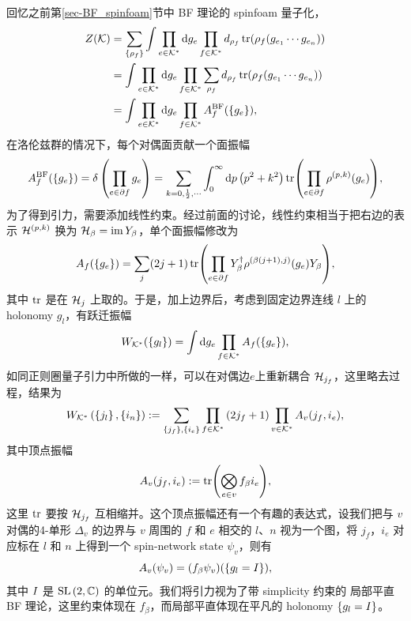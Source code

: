			回忆之前第\ref{sec-BF_spinfoam}节中 BF 理论的 spinfoam 量子化，
			\begin{equation}
				\begin{split}
					Z(\mathcal{K}) &= \sum_{\left\{ \rho_f \right\}} \int \prod_{e\in \mathcal{K}^*} \dd{g_e} \prod_{f\in \mathcal{K}^*} d_{\rho_f} \tr(\rho_f(g_{e_1} \cdots g_{e_n}))\\
					&= \int \prod_{e\in \mathcal{K}^*} \dd{g_e} \prod_{f\in \mathcal{K}^*} \sum_{\rho_f} d_{\rho_f} \tr(\rho_f(g_{e_1} \cdots g_{e_n}))\\
					&= \int \prod_{e\in \mathcal{K}^*} \dd{g_e} \prod_{f\in \mathcal{K}^*} A^{\text{BF}}_f(\{g_e\}),
				\end{split}
			\end{equation}
			在洛伦兹群的情况下，每个对偶面贡献一个面振幅
			\begin{equation}
				A^{\text{BF}}_f(\{g_e\}) = \delta \left( \prod_{e\in \partial f} g_e \right) = \sum_{k=0,\frac{1}{2},\cdots} \int_0^\infty \dd{p} \left( p^2 + k^2 \right) \tr(\prod_{e\in \partial f} \rho^{(p,k)}(g_e)),
			\end{equation}
			为了得到引力，需要添加线性约束。经过前面的讨论，线性约束相当于把右边的表示 $\mathcal{H}^{(p,k)}$ 换为 $\mathcal{H}_\beta = \operatorname{im}{Y_\beta}$，单个面振幅修改为
			\begin{equation}
				A_f(\{g_e\}) = \sum_{j} (2j+1) \tr(\prod_{e\in \partial f} Y^\dagger_\beta \rho^{(\beta(j+1),j)}(g_e) Y_\beta),
			\end{equation}
			其中 $\tr$ 是在 $\mathcal{H}_j$ 上取的。于是，加上边界后，考虑到固定边界连线 $l$ 上的 holonomy $g_l$，有跃迁振幅
			\begin{equation}
				W_{\mathcal{K}^*}(\{g_l\}) = \int \dd{g_e} \prod_{f\in \mathcal{K}^*} A_f(\{g_e\}),
			\end{equation}
			如同正则圈量子引力中所做的一样，可以在对偶边$e$上重新耦合 $\mathcal{H}_{j_f}$，这里略去过程，结果为\cite{Rovelli2011}
			\begin{equation}
				W_{\mathcal{K}^*}\left(\left\{ j_l \right\},\left\{ i_n \right\}\right) := \sum_{\left\{ j_f \right\},\left\{ i_e \right\}} \prod_{f\in \mathcal{K}^*} \left( 2j_f +1 \right) \prod_{v \in \mathcal{K}^*} A_v(j_f,i_e),
			\end{equation}
			其中顶点振幅
			\begin{equation}
				A_v(j_f,i_e) := \tr(\bigotimes_{e\in v} f_\beta i_e),
			\end{equation}
			这里 $\tr$ 要按 $\mathcal{H}_{j_f}$ 互相缩并。这个顶点振幅还有一个有趣的表达式，设我们把与 $v$ 对偶的4-单形 $\Delta_v$ 的边界与 $v$ 周围的 $f$ 和 $e$ 相交的 $l$、$n$ 视为一个图，将 $j_f$，$i_e$ 对应标在 $l$ 和 $n$ 上得到一个 spin-network state $\psi_v$，则有
			\begin{equation}
				A_v(\psi_v) = (f_\beta \psi_v)(\{g_l=I\}),
			\end{equation}
			其中 $I$ 是 $\mathrm{SL}\left( 2,\mathbb{C} \right)$ 的单位元。我们将引力视为了带 simplicity 约束的 局部平直 BF 理论，这里约束体现在 $f_\beta$，而局部平直体现在平凡的 holonomy $\{g_l = I\}$。

